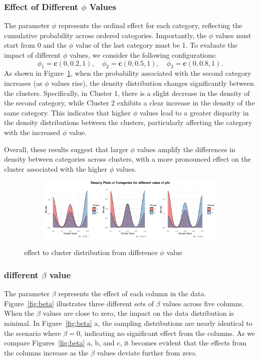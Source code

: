 \documentclass{article}
\begin{document}
\subsubsection*{Effect of Different $\phi$ Values}
The parameter $\phi$ represents the ordinal effect for each category, reflecting the cumulative probability across ordered categories. 
Importantly, the $\phi$ values must start from 0 and the $\phi$ value of the last category must be 1. 
To evaluate the impact of different $\phi$ values, we consider the following configurations:
\[
\phi_1 = \mathbf{c}(0, 0.2, 1), \quad \phi_2 = \mathbf{c}(0, 0.5, 1), \quad \phi_3 = \mathbf{c}(0, 0.8, 1).
\]
As shown in Figure~\ref{fig:phi}, 
when the probability associated with the second category increases (as $\phi$ values rise), 
the density distribution changes significantly between the clusters. 
Specifically, in Cluster 1, there is a slight decrease in the density of the second category, 
while Cluster 2 exhibits a clear increase in the density of the same category. 
This indicates that higher $\phi$ values lead to a greater disparity 
in the density distributions between the clusters, 
particularly affecting the category with the increased $\phi$ value.

Overall, these results suggest that larger $\phi$ values amplify the differences in density between categories across clusters, 
with a more pronounced effect on the cluster associated with the higher $\phi$ values.

\begin{figure}[ht]
  \centering
  \begin{subfigure}{1.0\textwidth}
      \centering
      \includegraphics[width=\textwidth]{images/para_sim/phi.png}
  \end{subfigure}
  \caption{effect to cluster distribution from difference $\phi$ value}
  \label{fig:phi}
\end{figure}

\subsubsection*{different $\beta$ value}
The parameter $\beta$ represents the effect of each column in the data. 
Figure~\ref{fig:beta} illustrates three different sets of $\beta$ values across five columns. 
When the $\beta$ values are close to zero, the impact on the data distribution is minimal. 
In Figure~\ref{fig:beta} a, the sampling distributions are nearly identical to the scenario where $\beta = 0$, 
indicating no significant effect from the columns. 
As we compare Figures~\ref{fig:beta} a, b, and c, it becomes evident that the effects 
from the columns increase as the $\beta$ values deviate further from zero.
\end{document}
